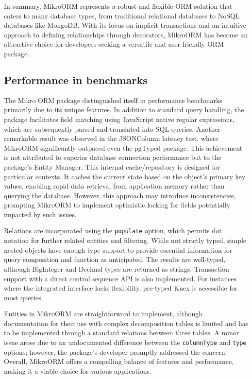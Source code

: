 In summary, MikroORM represents a robust and flexible ORM solution that caters
to many database types, from traditional relational databases to NoSQL databases
like MongoDB. With its focus on implicit transactions and an intuitive approach
to defining relationships through decorators, MikroORM has become an attractive
choice for developers seeking a versatile and user-friendly ORM package.

\subsection{Performance in benchmarks}

The Mikro ORM package distinguished itself in performance benchmarks primarily
due to its unique features. In addition to standard query handling, the package
facilitates field matching using JavaScript native regular expressions, which
are subsequently parsed and translated into SQL queries. Another remarkable
result was observed in the JSONColumn latency test, where MikroORM
significantly outpaced even the pgTyped package. This achievement is not
attributed to superior database connection performance but to the package's
Entity Manager. This internal cache/repository is designed for particular
contexts. It caches the current state based on the object's primary key values,
enabling rapid data retrieval from application memory rather than querying the
database. However, this approach may introduce inconsistencies, prompting
MikroORM to implement optimistic locking for fields potentially
impacted by such issues.

Relations are incorporated using the \texttt{populate} option, which permits dot
notation for further related entities and filtering. While not strictly typed,
simple nested objects have enough type support to provide essential information
for query composition and function as anticipated. The results are well-typed,
although BigInteger and Decimal types are returned as strings. Transaction
support with a direct control sequence API is also implemented. For instances
where the integrated interface lacks flexibility, pre-typed Knex is
accessible for most queries.

Entities in MikroORM are straightforward to implement, although documentation
for their use with complex decomposition tables is limited and has to be
implemented through a standard relations between three tables. A minor issue
arose due to an undocumented difference between the \texttt{columnType} and
\texttt{type} options; however, the package's developer promptly addressed the
concern. Overall, MikroORM offers a compelling balance of features and
performance, making it a viable choice for various applications.
